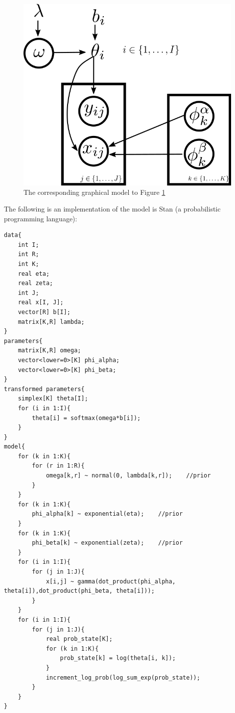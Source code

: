 \documentclass[]{article}
\begin{document}
\begin{figure}
    \centering
    \includegraphics{uploads/upload_33fde9a71f5f4e52d8c44158e39937df.png}
    \caption{The corresponding graphical model to Figure \ref{fig:simple_model_sketch}}
    \label{fig:simple_model_sketch}
\end{figure}


The following is an implementation of the model is Stan (a probabilistic
programming language):

\begin{verbatim}
data{
    int I;
    int R;
    int K;
    real eta;
    real zeta;
    int J;
    real x[I, J];
    vector[R] b[I];
    matrix[K,R] lambda;
}
parameters{
    matrix[K,R] omega;
    vector<lower=0>[K] phi_alpha;
    vector<lower=0>[K] phi_beta;
}
transformed parameters{
    simplex[K] theta[I];
    for (i in 1:I){
        theta[i] = softmax(omega*b[i]);
    }
}
model{
    for (k in 1:K){
        for (r in 1:R){
            omega[k,r] ~ normal(0, lambda[k,r]);    //prior
        }
    }
    for (k in 1:K){
        phi_alpha[k] ~ exponential(eta);    //prior
    }
    for (k in 1:K){
        phi_beta[k] ~ exponential(zeta);    //prior
    }
    for (i in 1:I){
        for (j in 1:J){
            x[i,j] ~ gamma(dot_product(phi_alpha, theta[i]),dot_product(phi_beta, theta[i]));
        }
    }
    for (i in 1:I){
        for (j in 1:J){
            real prob_state[K];
            for (k in 1:K){
                prob_state[k] = log(theta[i, k]);
            }
            increment_log_prob(log_sum_exp(prob_state));
        }
    }
}
\end{verbatim}
\end{document}
